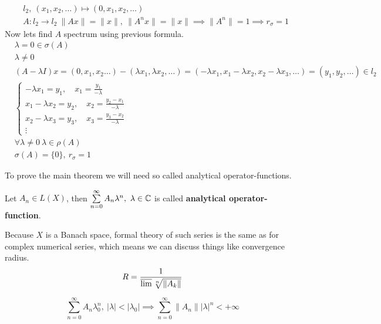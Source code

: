 \begin{note}
  \begin{align*}
    &l_2,\ (x_1, x_2, \dots) \mapsto (0, x_1, x_2, \dots) \\
    &A \colon l_2 \to l_2\ \|Ax\| = \|x\|,\ \|A^n x\| = \|x\| \implies \|A^n\| = 1 \implies r_\sigma = 1
  \end{align*}
  Now lets find $A$ spectrum using previous formula.
  \begin{align*}
    &\lambda = 0 \in \sigma(A) \\
    &\lambda \neq 0\\
    &(A - \lambda I) x = (0, x_1, x_2 \dots) - (\lambda x_1, \lambda x_2, \dots) = (-\lambda x_1, x_1 - \lambda x_2, x_2 - \lambda x_3, \dots) = (y_1, y_2, \dots) \in l_2 \\
    & \begin{cases}
      -\lambda x_1 = y_1,\quad x_1 = \frac{y_1}{-\lambda}\\
      x_1 - \lambda x_2 = y_2,\quad x_2 = \frac{y_2 - x_1}{-\lambda}\\
      x_2 - \lambda x_3 = y_3,\quad x_3 = \frac{y_3 - x_2}{-\lambda}\\
      \vdots
      \end{cases} \\
    &\forall \lambda \neq 0\ \lambda \in \rho(A) \\ 
    &\sigma(A) = \{0\},\ r_\sigma = 1
  \end{align*}
\end{note}

\noindent
To prove the main theorem we will need so called analytical operator-functions.
\begin{defn}
  Let $A_n \in L(X)$, then 
   $\sum\limits_{n = 0}^\infty A_n \lambda^n,\ \lambda \in \mathbb{C}$ is called
   \textbf{analytical operator-function}.
\end{defn}

\begin{note}
  Because $X$ is a Banach space, formal theory of such series is the same as for
  complex numerical series, which means we can discuss things like convergence radius.
  \[
    R = \frac{1}{\varlimsup \sqrt[n]{\|A_k\|}}
  \]
\end{note}

\begin{lemma}[Abel]
  \[
    \sum_{n = 0}^\infty A_n \lambda_0^n,\ |\lambda| < |\lambda_0| \implies
    \sum_{n = 0}^\infty \|A_n\| |\lambda|^n < +\infty
  \]
\end{lemma}

